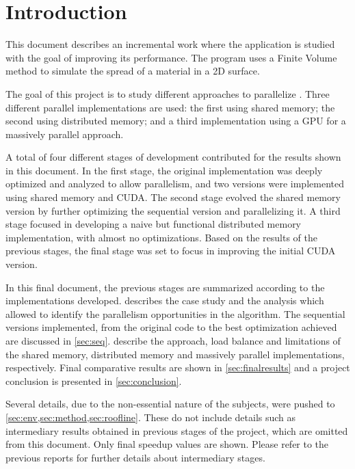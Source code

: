 \section{Introduction}

This document describes an incremental work where the \polu application is studied with the goal of improving its performance. The program uses a Finite Volume method to simulate the spread of a material in a 2D surface.

The goal of this project is to study different approaches to parallelize \polu. Three different parallel implementations are used: the first using shared memory; the second using distributed memory; and a third implementation using a GPU for a massively parallel approach.

A total of four different stages of development contributed for the results shown in this document.
In the first stage, the original implementation was deeply optimized and analyzed to allow parallelism, and two versions were implemented using shared memory and CUDA.
The second stage evolved the shared memory version by further optimizing the sequential version and parallelizing it.
A third stage focused in developing a naive but functional distributed memory implementation, with almost no optimizations.
Based on the results of the previous stages, the final stage was set to focus in improving the initial CUDA version.

In this final document, the previous stages are summarized according to the implementations developed.  describes the case study and the analysis which allowed to identify the parallelism opportunities in the algorithm. The sequential versions implemented, from the original code to the best optimization achieved are discussed in \cref{sec:seq}.  describe the approach, load balance and limitations of the shared memory, distributed memory and massively parallel implementations, respectively.
Final comparative results are shown in \cref{sec:finalresults} and a project conclusion is presented in \cref{sec:conclusion}.

Several details, due to the non-essential nature of the subjects, were pushed to \cref{sec:env,sec:method,sec:roofline}.
These do not include details such as intermediary results obtained in previous stages of the project, which are omitted from this document. Only final speedup values are shown. Please refer to the previous reports for further details about intermediary stages.















